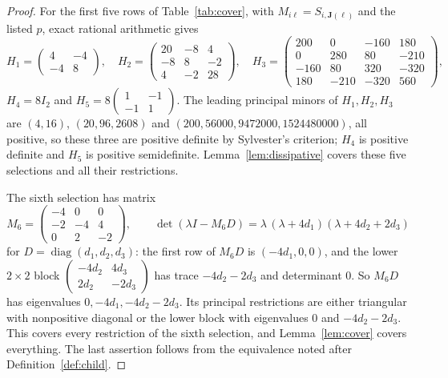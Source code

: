 \documentclass[11pt,a4paper]{article}
\theoremstyle{plain}
\theoremstyle{definition}
\theoremstyle{remark}
\newcommand{\diag}{\operatorname{diag}}
\begin{document}
\begin{proof}
For the first five rows of Table~\ref{tab:cover}, with $M_{i\ell}=S_{i,\mathbf J(\ell)}$ and the listed $p$, exact rational arithmetic gives
\[
H_1=\begin{pmatrix}4&-4\\-4&8\end{pmatrix},\quad
H_2=\begin{pmatrix}20&-8&4\\-8&8&-2\\4&-2&28\end{pmatrix},\quad
H_3=\begin{pmatrix}200&0&-160&180\\0&280&80&-210\\-160&80&320&-320\\180&-210&-320&560\end{pmatrix},
\]
$H_4=8I_2$ and $H_5=8\left(\begin{smallmatrix}1&-1\\-1&1\end{smallmatrix}\right)$. The leading principal minors of $H_1,H_2,H_3$ are $(4,16)$, $(20,96,2608)$ and $(200,56000,9472000,1524480000)$, all positive, so these three are positive definite by Sylvester's criterion; $H_4$ is positive definite and $H_5$ is positive semidefinite. Lemma~\ref{lem:dissipative} covers these five selections and all their restrictions.

The sixth selection has matrix
\begin{equation}\label{eq:Ab}
M_6=\begin{pmatrix}-4&0&0\\-2&-4&4\\0&2&-2\end{pmatrix},\qquad
\det(\lambda I-M_6D)=\lambda\,(\lambda+4d_1)(\lambda+4d_2+2d_3)
\end{equation}
for $D=\diag(d_1,d_2,d_3)$: the first row of $M_6D$ is $(-4d_1,0,0)$, and the lower $2\times2$ block $\left(\begin{smallmatrix}-4d_2&4d_3\\2d_2&-2d_3\end{smallmatrix}\right)$ has trace $-4d_2-2d_3$ and determinant $0$. So $M_6D$ has eigenvalues $0,-4d_1,-4d_2-2d_3$. Its principal restrictions are either triangular with nonpositive diagonal or the lower block with eigenvalues $0$ and $-4d_2-2d_3$. This covers every restriction of the sixth selection, and Lemma~\ref{lem:cover} covers everything. The last assertion follows from the equivalence noted after Definition~\ref{def:child}.
\end{proof}
\end{document}
